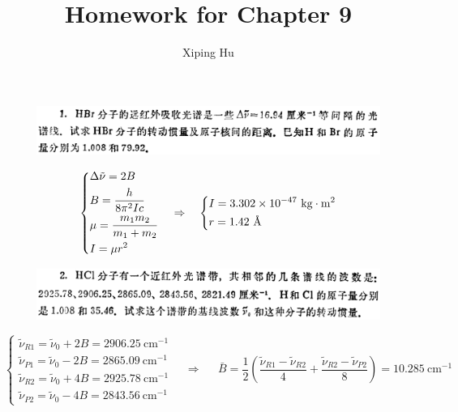 \documentclass{article}
\author{Xiping Hu}
\affil{https://hxp.plus/}
\title{Homework for Chapter 9}
\newcommand{\angstrom}{\text{\normalfont\AA}}
\newcommand{\si}[1]{\  \mathrm{#1}}
\begin{document}
\maketitle

\begin{figure}[H]
  \centering
  \includegraphics[width=\linewidth]{figures/Problem1}
  \label{fig:}
\end{figure}

\begin{equation*}
  \left\{
    \begin{aligned}
      & \Delta \tilde{\nu} = 2 B \\
      & B = \dfrac{h}{8 \pi^2 I c} \\
      & \mu = \dfrac{m_1 m_2}{m_1 + m_2} \\
      & I = \mu r^2
    \end{aligned}
  \right.
  \quad \Rightarrow \quad
  \left\{
    \begin{aligned}
      & I = 3.302 \times 10^{-47} \si{kg \cdot m^2} \\
      & r = 1.42 \si{\angstrom}
    \end{aligned}
  \right.
\end{equation*}

\begin{figure}[H]
  \centering
  \includegraphics[width=\linewidth]{figures/Problem2}
  \label{fig:}
\end{figure}

\begin{equation*}
  \left\{
    \begin{aligned}
      \tilde{\nu}_{R1} = \tilde{\nu}_0 + 2 B = 2906.25 \si{cm^{-1}} \\
      \tilde{\nu}_{P1} = \tilde{\nu}_0 - 2 B = 2865.09 \si{cm^{-1}} \\
      \tilde{\nu}_{R2} = \tilde{\nu}_0 + 4 B = 2925.78 \si{cm^{-1}} \\
      \tilde{\nu}_{P2} = \tilde{\nu}_0 - 4 B = 2843.56 \si{cm^{-1}}
    \end{aligned}
  \right.
  \quad \Rightarrow \quad 
  \begin{aligned}
    \bar{B} = \dfrac{1}{2} \left( \dfrac{\tilde{\nu}_{R1} - \tilde{\nu}_{R2}}{4} + \dfrac{\tilde{\nu}_{R2} - \tilde{\nu}_{P2}}{8}  \right) = 10.285 \si{cm^{-1}} 
  \end{aligned}
\end{equation*}
\end{document}
